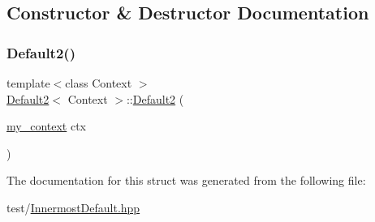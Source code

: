 \subsection{Constructor \& Destructor Documentation}
\mbox{\label{struct_default2_a3ef5327652833780889d9ed543115e75}} 
\subsubsection{\texorpdfstring{Default2()}{Default2()}}
{\footnotesize\ttfamily template$<$class Context $>$ \\
\mbox{\hyperlink{struct_default2}{Default2}}$<$ Context $>$\+::\mbox{\hyperlink{struct_default2}{Default2}} (\begin{DoxyParamCaption}\item[{\mbox{\hyperlink{struct_default2_aa57309f1d125010ae36dd0793bc35535}{my\+\_\+context}}}]{ctx }\end{DoxyParamCaption})\hspace{0.3cm}{\ttfamily [inline]}}



The documentation for this struct was generated from the following file\+:\begin{DoxyCompactItemize}
\item 
test/\mbox{\hyperlink{_innermost_default_8hpp}{Innermost\+Default.\+hpp}}\end{DoxyCompactItemize}
